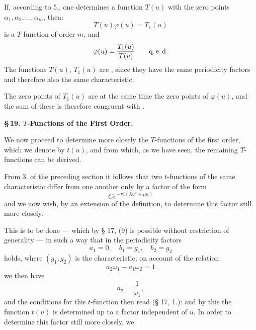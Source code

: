 If, according to 5., one determines a function $T(u)$ with the zero points $\alpha_1, \alpha_2, \ldots, \alpha_m$, then:
\[
T(u)\varphi(u) = T_1(u)
\]
is a $T$-function of order $m$, and
\[
\varphi(u) = \frac{T_1(u)}{T(u)} \qquad \text{q.\,e.\,d.}
\]
The functions $T(u)$, $T_1(u)$ are , since they have the same periodicity factors and therefore also the same characteristic.

The zero points of $T_1(u)$ are at the same time the zero points of $\varphi(u)$, and the sum of these  is therefore congruent with .

\begin{center}
\textbf{\S\,19. $T$-Functions of the First Order.}
\end{center}

We now proceed to determine more closely the $T$-functions of the first order, which we denote by $t(u)$, and from which, as we have seen, the remaining $T$-functions can be derived.

From 3. of the preceding section it follows that two $t$-functions of the same characteristic differ from one another only by a factor of the form
\[
Ce^{-\pi i(\lambda u^2+\mu u)}
\]
and we now wish, by an extension of the definition, to determine this factor still more closely.

This is to be done — which by § 17, (9) is possible without restriction of generality — in such a way that in the periodicity factors
\[
a_1 = 0, \quad b_1 = g_1, \quad b_2 = g_2
\]
holds, where $(g_1, g_2)$ is the characteristic; on account of the relation
\[
a_2\omega_1 - a_1\omega_2 = 1
\]
we then have
\[
a_2 = \frac{1}{\omega_1},
\]
and the conditions for this $t$-function then read (§ 17, 1.):
and by this the function $t(u)$ is determined up to a factor independent of $u$. In order to determine this factor still more closely, we
